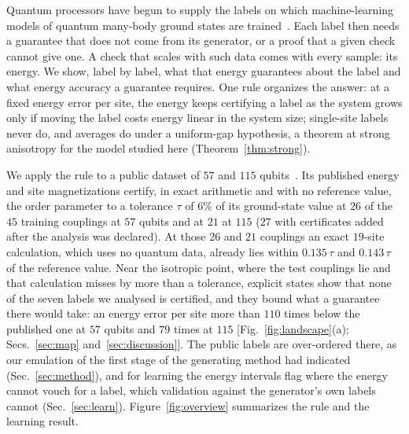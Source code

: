 \documentclass[aps,prx,twocolumn,10pt,superscriptaddress,nofootinbib,longbibliography,floatfix]{revtex4-2}
\theoremstyle{remark}
\begin{document}
Quantum processors have begun to supply the labels on which machine-learning models of quantum many-body ground
states are trained~\cite{cho2024,jaderberg2026}. Each label then needs a guarantee that does not come
from its generator, or a proof that a given check cannot give one. A check that scales with such data comes with
every sample: its energy. We show, label by label, what that energy guarantees about the label and what energy
accuracy a guarantee requires. One rule organizes the answer: at a fixed energy error per site, the energy keeps
certifying a label as the system grows only if moving the label costs energy linear in the system size;
single-site labels never do, and averages do under a uniform-gap hypothesis, a theorem at strong anisotropy for
the model studied here (Theorem~\ref{thm:strong}).

We apply the rule to a public dataset of $57$ and $115$ qubits~\cite{jaderberg2026,jaderberg2026data}. Its published energy and site %
magnetizations certify, in exact arithmetic and with no reference value, the order parameter to a tolerance
$\tau$ of $6\%$ of its ground-state value at $26$ of the $45$ training couplings at $57$ qubits and at $21$ at %
$115$ ($27$ with certificates added after the analysis was declared). At those $26$ and $21$ couplings an exact %
$19$-site calculation, which uses no quantum data, already lies within $0.135\,\tau$ and $0.143\,\tau$ of the %
reference value. Near the
isotropic point, where the test couplings lie and that calculation misses by more than a tolerance, explicit states
show that none of the seven labels we analysed is certified, and they bound what a guarantee there would take: an
energy error per site more than $110$ times below the published one at $57$ qubits and $79$ times at $115$ %
[Fig.~\ref{fig:landscape}(a); Secs.~\ref{sec:map} and~\ref{sec:discussion}]. The public labels are over-ordered
there, as our emulation of the first stage of the generating method had indicated (Sec.~\ref{sec:method}), and for
learning the energy intervals flag where the energy cannot vouch for a label, which validation against the
generator's own labels cannot (Sec.~\ref{sec:learn}). Figure~\ref{fig:overview} summarizes the rule and the
learning result.
\end{document}
